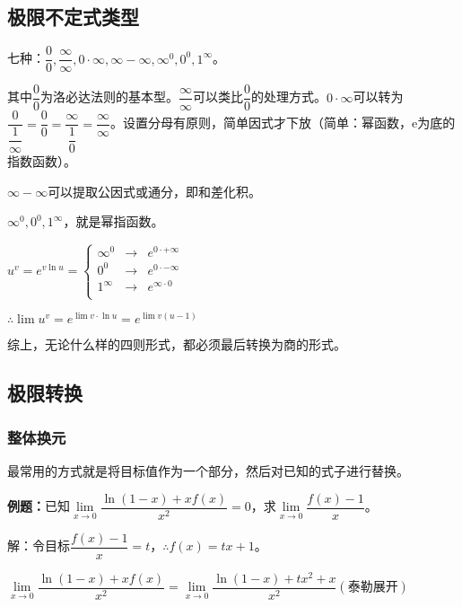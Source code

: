 \documentclass[UTF8, 12pt]{ctexart}
\begin{document}
\subsection{极限不定式类型}

七种：$\dfrac{0}{0},\dfrac{\infty}{\infty},0\cdot\infty,\infty-\infty,\infty^0,0^0,1^\infty$。

\medskip

其中$\dfrac{0}{0}$为洛必达法则的基本型。$\dfrac{\infty}{\infty}$可以类比$\dfrac{0}{0}$的处理方式。$0\cdot\infty$可以转为$\dfrac{0}{\dfrac{1}{\infty}}=\dfrac{0}{0}=\dfrac{\infty}{\dfrac{1}{0}}=\dfrac{\infty}{\infty}$。设置分母有原则，简单因式才下放（简单：幂函数，e为底的指数函数）。 

$\infty-\infty$可以提取公因式或通分，即和差化积。

\medskip

$\infty^0,0^0,1^\infty$，就是幂指函数。

\medskip

$
u^v=e^{v\ln u}=\left\{
\begin{array}{lcl}
    \infty^0 & \rightarrow & e^{0\cdot+\infty} \\
    0^0 & \rightarrow & e^{0\cdot-\infty} \\
    1^\infty & \rightarrow & e^{\infty\cdot 0} \\
\end{array} \right.
$

\medskip

$\therefore \lim u^v=e^{\lim v\cdot\ln u}=e^{\lim v(u-1)}$

综上，无论什么样的四则形式，都必须最后转换为商的形式。

\subsection{极限转换}

\subsubsection{整体换元}

最常用的方式就是将目标值作为一个部分，然后对已知的式子进行替换。

\textbf{例题：}已知$\lim\limits_{x\to 0}\dfrac{\ln(1-x)+xf(x)}{x^2}=0$，求$\lim\limits_{x\to 0}\dfrac{f(x)-1}{x}$。\medskip

解：令目标$\dfrac{f(x)-1}{x}=t$，$\therefore f(x)=tx+1$。\medskip

$\lim\limits_{x\to 0}\dfrac{\ln(1-x)+xf(x)}{x^2}=\lim\limits_{x\to 0}\dfrac{\ln(1-x)+tx^2+x}{x^2} (\text{泰勒展开})$\medskip
\end{document}
